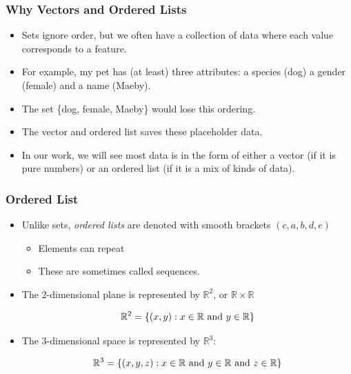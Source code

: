 \documentclass[aspectratio=169]{beamer}
\numberwithin{equation}{section}
\begin{document}
\begin{frame}
\frametitle{Why Vectors and Ordered Lists}
\begin{itemize}
\item Sets ignore order, but we often have a collection of data where each value corresponds to a feature.\pause
\item For example, my pet has (at least) three attributes: a species (dog) a gender (female) and a name (Maeby).\pause
\item The set \{dog, female, Maeby\} would lose this ordering.\pause
\item The vector and ordered list saves these placeholder data.\pause
\item In our work, we will see most data is in the form of either a vector (if it is pure numbers) or an ordered list (if it is a mix of kinds of data).
\end{itemize}
\end{frame}


\begin{frame}
\frametitle{Ordered List}

\begin{itemize}
\item  Unlike sets, \textit{ordered lists} are denoted with smooth brackets $(c, a, b, d, e)$ \pause
\begin{itemize}
\item Elements can repeat \pause
\item These are sometimes called sequences.
\end{itemize}
\item The 2-dimensional plane is represented by $\mathbb{R}^2$, or $\mathbb{R}\times \mathbb{R}$

$$\mathbb{R}^2=\{(x, y): x\in \mathbb{R} \hbox{ and }y\in \mathbb{R} \}$$
\item The 3-dimensional space is represented by $\mathbb{R}^3$:

$$\mathbb{R}^3=\{(x, y, z): x\in \mathbb{R} \hbox{ and }y\in \mathbb{R}\hbox{ and } z\in \mathbb{R}  \}$$
\end{itemize}

\end{frame}
\end{document}
